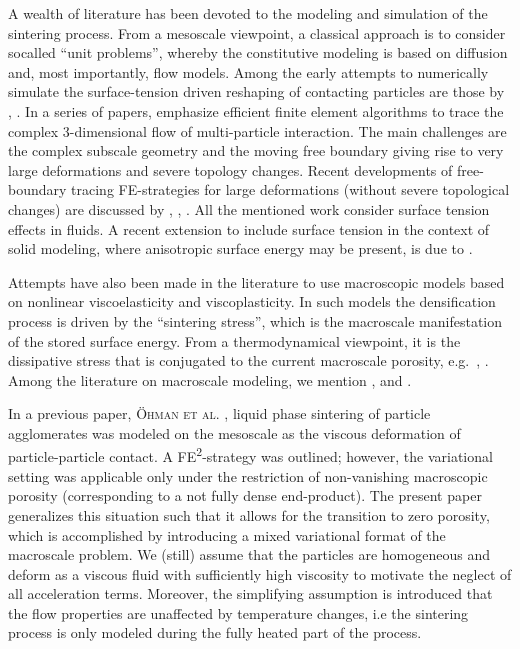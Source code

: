 \documentclass[12pt,review]{elsarticle}
\begin{document}
A wealth of literature has been devoted to the modeling and simulation of the sintering process.
From a mesoscale viewpoint, a classical approach is to consider socalled ``unit problems'', whereby the constitutive modeling is based on diffusion and, most importantly, flow models.
Among the early attempts to numerically simulate the surface-tension driven reshaping of contacting particles are those by \cite{JagDaw1988a,JagDaw1988b}, \cite{Vorst1993}.
In a series of papers, \cite{ZhoDer1998,ZhoDer2001} emphasize efficient finite element algorithms to trace the complex 3-dimensional flow of multi-particle interaction.
The main challenges  are the complex subscale geometry and the moving free boundary giving rise to very large deformations and severe topology changes.
Recent developments of free-boundary tracing FE-strategies for large deformations (without severe topological changes) are discussed by \cite{DetPer2006}, \cite{SakPer2006a}, \cite{SakPer2006b}.
All the mentioned work consider surface tension effects in fluids.
A recent extension to include surface tension in the context of solid modeling, where anisotropic surface energy may be present, is due to \cite{JavSte2009:2d,JavSte2010:3d}.

Attempts have also been made in the literature to use macroscopic models based on nonlinear viscoelasticity and viscoplasticity.
In such models the densification process is driven by the ``sintering stress'', which is the macroscale manifestation of the stored surface energy.
From a thermodynamical viewpoint, it is the dissipative stress that is conjugated to the current macroscale porosity, e.g.\ \cite{ReiOak1990}, \cite{MahRun2000}.
Among the literature on macroscale modeling, we mention \cite{Svoetal1996}, \cite{XuMeh1997} and \cite{Luetal2001:porosity}.


In a previous paper, \textsc{\"Ohman et al.} \cite{Ohman2012a}, liquid phase sintering of particle agglomerates was modeled on the mesoscale as the viscous deformation of particle-particle contact.
A FE\textsuperscript{2}-strategy was outlined; however, the variational setting was applicable only under the restriction of non-vanishing macroscopic porosity (corresponding to a not fully dense end-product).
The present paper generalizes this situation such that it allows for the transition to zero porosity, which is accomplished by introducing a mixed variational format of the macroscale problem.
We (still) assume that the particles are homogeneous and deform as a viscous fluid with sufficiently high viscosity to motivate the neglect of all acceleration terms.
Moreover, the simplifying assumption is introduced that the flow properties are unaffected by temperature changes, i.e the sintering process is only modeled during the fully heated part of the process.
\end{document}
